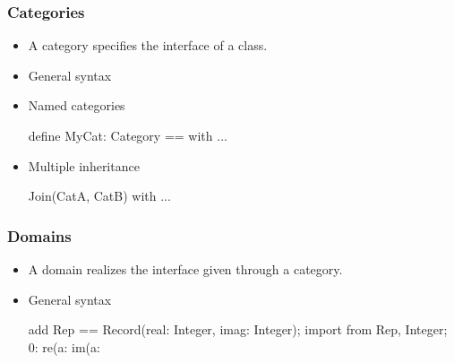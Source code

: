 \begin{frame}[fragile]
\frametitle{Categories}
\begin{itemize}
\item A category specifies the interface of a class.

\item General syntax

\item Named categories
\begin{myverbatim}
define MyCat: Category == with { ... }
\end{myverbatim}

\item Multiple inheritance
\begin{myverbatim}
Join(CatA, CatB) with { ... }
\end{myverbatim}
\end{itemize}
\end{frame}












\begin{frame}[fragile]
\frametitle{Domains}
\begin{itemize}
\item A domain realizes the interface given through a category.
\item General syntax
\begin{myverbatim}
add {
  Rep == Record(real: Integer, imag: Integer);
  import from Rep, Integer;
  0: %
  re(a: %
  im(a: %
}
\end{myverbatim}
\end{itemize}
\end{frame}



















